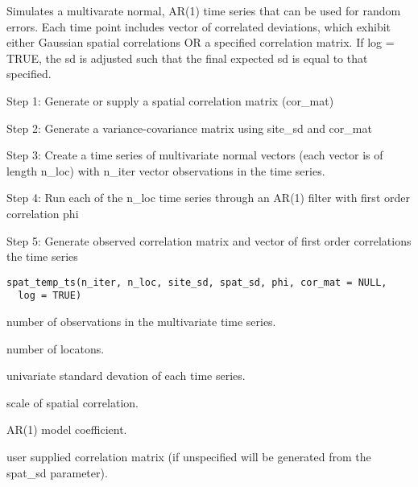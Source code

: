 \documentclass[letterpaper]{book}
\begin{document}
%
\begin{Description}\relax
Simulates a multivarate normal, AR(1) time series that can be used for random errors.  Each time point includes vector of correlated deviations, which exhibit either Gaussian spatial correlations OR a specified correlation matrix.   If log = TRUE, the sd is adjusted such that the final expected sd is equal to that specified.

Step 1: Generate or supply a spatial correlation matrix (cor\_mat)

Step 2: Generate a variance-covariance matrix using site\_sd and cor\_mat

Step 3: Create a time series of multivariate normal vectors (each vector is of length n\_loc) with n\_iter vector observations in the time series. 

Step 4: Run each of the n\_loc time series through an AR(1) filter with first order correlation phi

Step 5: Generate observed correlation matrix and vector of first order correlations the time series
\end{Description}
%
\begin{Usage}
\begin{verbatim}
spat_temp_ts(n_iter, n_loc, site_sd, spat_sd, phi, cor_mat = NULL,
  log = TRUE)
\end{verbatim}
\end{Usage}
%
\begin{Arguments}
\begin{ldescription}
\item[\code{n\_iter}] number of observations in the multivariate time series.

\item[\code{n\_loc}] number of locatons.

\item[\code{site\_sd}] univariate standard devation of each time series.

\item[\code{spat\_sd}] scale of spatial correlation.

\item[\code{phi}] AR(1) model coefficient.

\item[\code{cor\_mat}] user supplied correlation matrix (if unspecified will be generated from the spat\_sd parameter).
\end{ldescription}
\end{Arguments}
\end{document}
